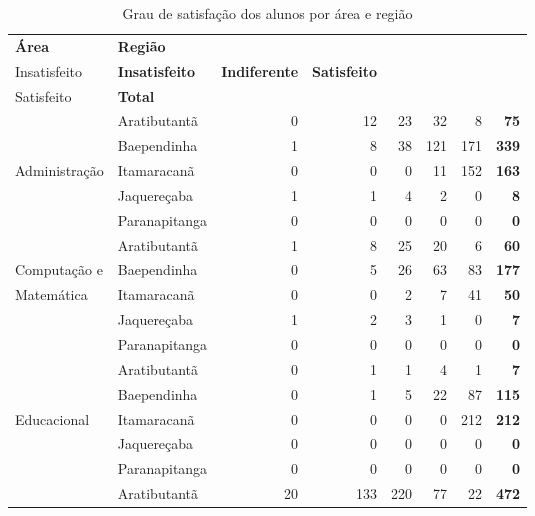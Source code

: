 \begin{table}[h]
\footnotesize
\centering
\caption{Grau de satisfação dos alunos por área e região}
\vspace{0.5em}
\label{tabela:q15}
\begin{tabular}{ll rrrrrr}
  \toprule
  \textbf{Área}        	& \textbf{Região} &  \textbf{\specialcell{c}{Muito\\Insatisfeito}} &  \textbf{Insatisfeito} &  \textbf{ Indiferente} &  \textbf{ Satisfeito} & \textbf{\specialcell{c}{Muito\\Satisfeito}} & \textbf{Total} \\
   \midrule
					& Aratibutantã  &   0 &  12 &  23 &  32 &   8 & \textbf{75}\\ 
                    & Baependinha   &   1 &   8 &  38 & 121 & 171 & \textbf{339}\\ 
   Administração    & Itamaracanã   &   0 &   0 &   0 &  11 & 152 & \textbf{163}\\ 
                    & Jaquereçaba   &   1 &   1 &   4 &   2 &   0 & \textbf{8}\\ 
                    & Paranapitanga &   0 &   0 &   0 &   0 &   0 & \textbf{0}\\ 
\midrule
					& Aratibutantã  &   1 &   8 &  25 &  20 &   6 & \textbf{60}\\ 
	Computação e    & Baependinha   &   0 &   5 &  26 &  63 &  83 & \textbf{177}\\ 
	Matemática  	& Itamaracanã   &   0 &   0 &   2 &   7 &  41 & \textbf{50}\\ 
					& Jaquereçaba   &   1 &   2 &   3 &   1 &   0 & \textbf{7}\\ 
                    & Paranapitanga	&   0 &   0 &   0 &   0 &   0 & \textbf{0}\\ 
\midrule
					& Aratibutantã  &   0 &   1 &   1 &   4 &   1 & \textbf{7}\\ 
                    & Baependinha   &   0 &   1 &   5 &  22 &  87 & \textbf{115}\\ 
  Educacional       & Itamaracanã   &   0 &   0 &   0 &   0 & 212 & \textbf{212}\\ 
                    & Jaquereçaba   &   0 &   0 &   0 &   0 &   0 & \textbf{0}\\ 
                    & Paranapitanga &   0 &   0 &   0 &   0 &   0 & \textbf{0}\\ 
\midrule			
					& Aratibutantã  &  20 & 133 & 220 &  77 &  22 & \textbf{472}\\ 

\end{tabular}
\end{table}
